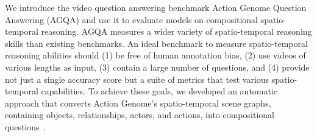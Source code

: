 \documentclass[10pt,twocolumn,letterpaper]{article}
\newcommand{\rak}[1]{{\color{red}{rak: #1}}}
\newcommand{\mgm}[1]{{\color{cyan}{mgm: #1}}}
\begin{document}
We introduce the video question answering benchmark Action Genome Question Answering (AGQA) and use it to evaluate models on compositional spatio-temporal reasoning. AGQA measures a wider variety of spatio-temporal reasoning skills than existing benchmarks. An ideal benchmark to measure spatio-temporal reasoning abilities should (1) be free of human annotation bias, (2) use videos of various lengths as input, (3) contain a large number of questions, and (4) provide not just a single accuracy score but a suite of metrics that test various spatio-temporal capabilities. To achieve these goals, we developed an automatic approach that converts Action Genome’s spatio-temporal scene graphs, containing objects, relationships, actors, and actions, into compositional questions~\cite{ji2020action}. \mgm{this list came from the HAI thing, but I'm less convinced now on how important 2-3 are to bring up here. May want to bring up compositionality more explicity since we've pivoted a bit towards that, but also I'll need to have results probably that show that more compositional questions are harder.}

\end{document}
